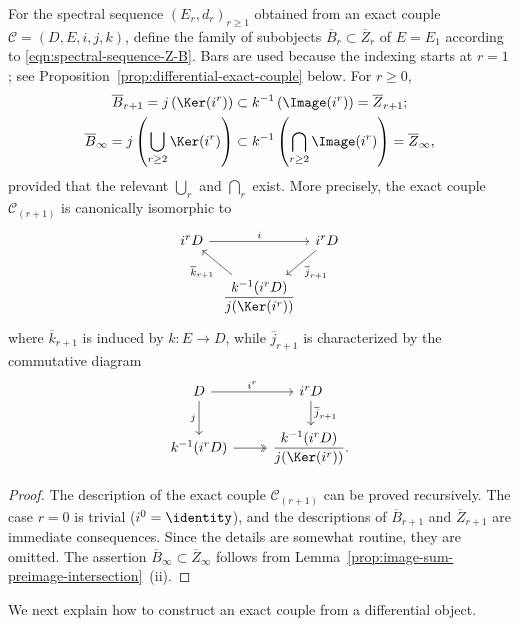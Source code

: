 \begin{lemma}\label{prop:exact-couple-Z-B}
	For the spectral sequence $(E_r,d_r)_{r\geq1}$ obtained from an exact
	couple $\mathscr{C}=(D,E,i,j,k)$, define the family of subobjects
	$\overline{B}_r\subset\overline{Z}_r$ of $E=E_1$ according to
	\eqref{eqn:spectral-sequence-Z-B}. Bars are used because the indexing
	starts at $r=1$; see Proposition~\ref{prop:differential-exact-couple} below.
	For $r\geq0$,
	\begin{gather*}
		\overline{B}_{r+1}=j\left(\Ker(i^r)\right)
		\subset k^{-1}\left(\Image(i^r)\right)=\overline{Z}_{r+1}; \\
		\overline{B}_\infty=j\left(\bigcup_{r\geq2}\Ker(i^r)\right)
		\subset k^{-1}\left(\bigcap_{r\geq2}\Image(i^r)\right)
		=\overline{Z}_\infty,
	\end{gather*}
	provided that the relevant $\bigcup_r$ and $\bigcap_r$ exist. More
	precisely, the exact couple $\mathscr{C}_{(r+1)}$ is canonically isomorphic
	to
	\[\begin{tikzcd}[column sep=tiny]
		i^rD \arrow[rr, "i"] & & i^rD \arrow[ld, "{\overline{j}_{r+1}}"] \\
		& \dfrac{k^{-1}(i^rD)}{j(\Ker(i^r))}
		\arrow[lu, "{\overline{k}_{r+1}}"] &
	\end{tikzcd}\]
	where $\overline{k}_{r+1}$ is induced by $k:E\to D$, while
	$\overline{j}_{r+1}$ is characterized by the commutative diagram
	\[\begin{tikzcd}
		D \arrow[r, "{i^r}"] \arrow[d, "j"'] &
		i^rD \arrow[d, "{\overline{j}_{r+1}}"] \\
		k^{-1}(i^rD) \arrow[twoheadrightarrow, r] &
		\dfrac{k^{-1}(i^rD)}{j(\Ker(i^r))}.
	\end{tikzcd}\]
\end{lemma}
\begin{proof}
	The description of the exact couple $\mathscr{C}_{(r+1)}$ can be proved
	recursively. The case $r=0$ is trivial ($i^0=\identity$), and the
	descriptions of $\overline{B}_{r+1}$ and $\overline{Z}_{r+1}$ are immediate
	consequences. Since the details are somewhat routine, they are omitted.
	The assertion $\overline{B}_\infty\subset\overline{Z}_\infty$ follows from
	Lemma~\ref{prop:image-sum-preimage-intersection}~(ii).
\end{proof}

We next explain how to construct an exact couple from a differential object.

